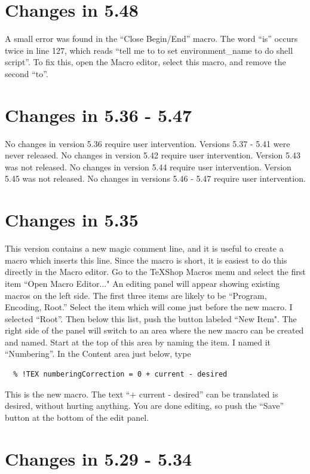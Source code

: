 \documentclass[11pt, oneside]{amsart}
\begin{document}
\section{Changes in 5.48}

A small error was found in the ``Close Begin/End'' macro. The word ``is'' occurs twice in line 127,
which reads ``tell me to to set environment\_name to do shell script''. To fix this, open the Macro editor,
select this macro, and remove the second ``to''. 

\section{Changes in 5.36 - 5.47}

No changes in version 5.36 require user intervention. Versions 5.37 - 5.41 were never released. No changes in version 5.42 require user intervention. Version 5.43 was not released. No changes in version 5.44 require user intervention.
Version 5.45 was not released. No changes in versions 5.46 - 5.47 require user intervention.

\section{Changes in 5.35}

This version contains a new magic comment line, and it is useful to create a macro which inserts this line. Since the macro is short, it is easiest to do this directly in the Macro editor. Go to the TeXShop Macros menu and select the first item ``Open Macro Editor..." An editing panel will appear showing existing macros on the left side. The first three items are likely to be ``Program, Encoding, Root.'' Select the item which will come just before the new macro. I selected ``Root''. Then below this list, push the button labeled ``New Item". The right side of the panel will switch to an area where the new macro can be created and named. Start at the top of this area by naming the item.
I named it ``Numbering''. In the Content area just below, type
\begin{verbatim}
  % !TEX numberingCorrection = 0 + current - desired
\end{verbatim}
This is the new macro. The text ``+ current - desired'' can be translated is desired, without hurting anything.
You are done editing, so push the ``Save'' button at the bottom of the edit panel.


\section{Changes in 5.29 - 5.34}
\end{document}
